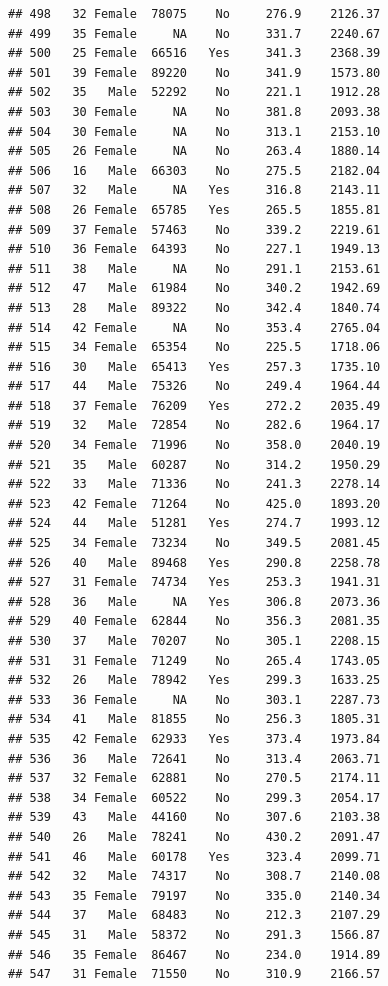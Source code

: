 \documentclass[12pt,]{krantz}
\theoremstyle{definition}
\theoremstyle{definition}
\theoremstyle{remark}
\begin{document}
\begin{verbatim}
## 498   32 Female  78075    No     276.9    2126.37
## 499   35 Female     NA    No     331.7    2240.67
## 500   25 Female  66516   Yes     341.3    2368.39
## 501   39 Female  89220    No     341.9    1573.80
## 502   35   Male  52292    No     221.1    1912.28
## 503   30 Female     NA    No     381.8    2093.38
## 504   30 Female     NA    No     313.1    2153.10
## 505   26 Female     NA    No     263.4    1880.14
## 506   16   Male  66303    No     275.5    2182.04
## 507   32   Male     NA   Yes     316.8    2143.11
## 508   26 Female  65785   Yes     265.5    1855.81
## 509   37 Female  57463    No     339.2    2219.61
## 510   36 Female  64393    No     227.1    1949.13
## 511   38   Male     NA    No     291.1    2153.61
## 512   47   Male  61984    No     340.2    1942.69
## 513   28   Male  89322    No     342.4    1840.74
## 514   42 Female     NA    No     353.4    2765.04
## 515   34 Female  65354    No     225.5    1718.06
## 516   30   Male  65413   Yes     257.3    1735.10
## 517   44   Male  75326    No     249.4    1964.44
## 518   37 Female  76209   Yes     272.2    2035.49
## 519   32   Male  72854    No     282.6    1964.17
## 520   34 Female  71996    No     358.0    2040.19
## 521   35   Male  60287    No     314.2    1950.29
## 522   33   Male  71336    No     241.3    2278.14
## 523   42 Female  71264    No     425.0    1893.20
## 524   44   Male  51281   Yes     274.7    1993.12
## 525   34 Female  73234    No     349.5    2081.45
## 526   40   Male  89468   Yes     290.8    2258.78
## 527   31 Female  74734   Yes     253.3    1941.31
## 528   36   Male     NA   Yes     306.8    2073.36
## 529   40 Female  62844    No     356.3    2081.35
## 530   37   Male  70207    No     305.1    2208.15
## 531   31 Female  71249    No     265.4    1743.05
## 532   26   Male  78942   Yes     299.3    1633.25
## 533   36 Female     NA    No     303.1    2287.73
## 534   41   Male  81855    No     256.3    1805.31
## 535   42 Female  62933   Yes     373.4    1973.84
## 536   36   Male  72641    No     313.4    2063.71
## 537   32 Female  62881    No     270.5    2174.11
## 538   34 Female  60522    No     299.3    2054.17
## 539   43   Male  44160    No     307.6    2103.38
## 540   26   Male  78241    No     430.2    2091.47
## 541   46   Male  60178   Yes     323.4    2099.71
## 542   32   Male  74317    No     308.7    2140.08
## 543   35 Female  79197    No     335.0    2140.34
## 544   37   Male  68483    No     212.3    2107.29
## 545   31   Male  58372    No     291.3    1566.87
## 546   35 Female  86467    No     234.0    1914.89
## 547   31 Female  71550    No     310.9    2166.57

\end{verbatim}
\end{document}
